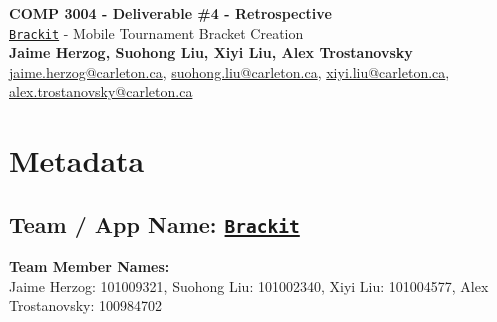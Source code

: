 \documentclass{article}
\begin{document}
\begin{center}


    \LARGE{\textbf{COMP 3004 - Deliverable \#4 - Retrospective}} \\
    \vspace{1em}
    \Large{\href{https://github.com/alextrosta/brackit}{\texttt{Brackit}} - Mobile Tournament Bracket Creation} \\
    \vspace{1em}
    \normalsize\textbf{Jaime Herzog, Suohong Liu, Xiyi Liu, Alex Trostanovsky} \\
    \normalsize{
        \href{mailto:jaime.herzog@carleton.ca}{jaime.herzog@carleton.ca},
        \href{mailto:suohong.liu@carleton.ca}{suohong.liu@carleton.ca},
        \href{mailto:xiyi.liu@carleton.ca}{xiyi.liu@carleton.ca},
        \href{mailto:alex.trostanovsky@carleton.ca}{alex.trostanovsky@carleton.ca}
    }

\end{center}
\begin{normalsize}

\end{normalsize}

\section*{Metadata}
\subsection*{Team / App Name: \href{https://github.com/alextrosta/brackit}{\texttt{Brackit}}}
\textbf{Team Member Names:}\\ Jaime Herzog: 101009321, Suohong Liu: 101002340, Xiyi Liu: 101004577, Alex Trostanovsky: 100984702
\end{document}
